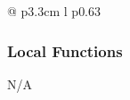 \documentclass[12pt]{article}
\newcommand{\colDescrip}{0.63\textwidth}
\newcommand{\newfunc}{\\[1.5em]}
\begin{document}
\begin{longtable*}{@{} p{3.3cm} l p{\colDescrip}}
\end{longtable*} 

\subsubsection{Local Functions} \label{SecLFBody}

N/A
\end{document}
